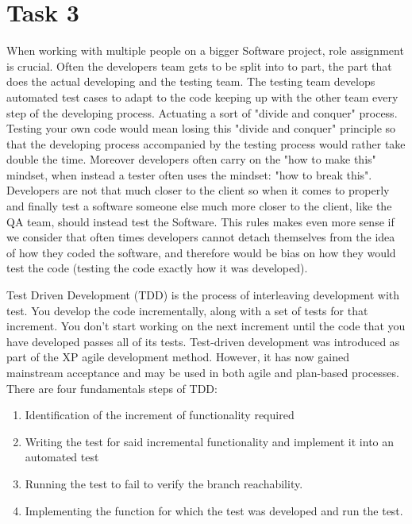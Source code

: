 \chapter{Task 3}
\begin{parlist}
	\item When working with multiple people on a bigger Software project, role assignment is crucial. Often the developers team gets to be split into to part, the part that does the actual developing and the testing team. The testing team develops automated test cases to adapt to the code keeping up with the other team every step of the developing process. Actuating a sort of "divide and conquer" process. Testing your own code would mean losing this "divide and conquer" principle so that the developing process accompanied by the testing process would rather take double the time. Moreover developers often carry on the "how to make this" mindset, when instead a tester often uses the mindset: "how to break this". Developers are not that much closer to the client so when it comes to properly and finally test a software someone else much more closer to the client, like the QA team, should instead test the Software. This rules makes even more sense if we consider that often times developers cannot detach themselves from the idea of how they coded the software, and therefore would be bias on how they would test the code (testing the code exactly how it was developed). \cite{stackexchangeDevelopersTest}\cite{Sommerville:2004aa}
	\item Test Driven Development (TDD) is the process of interleaving development with test. You develop the code incrementally, along with a set of tests for that increment. You don’t start working on the next increment until the code that you have developed passes all of its tests. Test-driven development was introduced as part of the XP agile development method. However, it has now gained mainstream acceptance and may be used in both agile and plan-based processes. There are four fundamentals steps of TDD:
		\begin{enumerate}
			\item Identification of the increment of functionality required
			\item Writing the test for said incremental functionality and implement it into an automated test 
			\item Running the test to fail to verify the branch reachability.
			\item Implementing the function for which the test was developed and run the test.

\end{enumerate}
\end{parlist}
